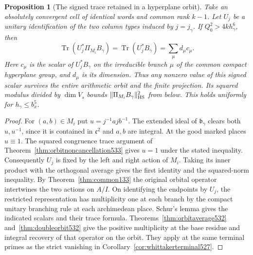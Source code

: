 \documentclass[a4paper,11pt]{article}
\newtheorem{proposition}{Proposition}[section]
\theoremstyle{definition}
\theoremstyle{remark}
\numberwithin{equation}{section}
\begin{document}
\begin{proposition}[The signed trace retained in a hyperplane orbit]
\leavevmode\label{prop:hyperplanetrace534}
Take an absolutely convergent cell of identical words and
common rank \(k-1\). Let \(U_j\) be a unitary identification
of the two column types induced by \(j=j_\gamma\). If
\(Q_0^2>4k h_\gamma^6\), then
\[
       \operatorname{Tr}(U_j^*\Pi_{M_i}B_\gamma)
          =\operatorname{Tr}(U_j^*B_\gamma)
          =\sum_{\mu}d_\mu c_\mu .
\]
Here \(c_\mu\) is the scalar of \(U_j^*B_\gamma\) on the
irreducible branch \(\mu\) of the common compact hyperplane
group, and \(d_\mu\) is its dimension. Thus any nonzero value
of this signed scalar survives the entire arithmetic orbit
and the finite projection. Its squared modulus divided by
\(\dim V_s\) bounds \(\|\Pi_{M_i}B_\gamma\|_{\rm HS}^2\) from
below. This holds uniformly for \(h_\gamma\le b_x^5\).
\end{proposition}
\begin{proof}
For \((a,b)\in M_i\) put \(u=j^{-1}ajb^{-1}\). The extended
ideal of \(\mathfrak b_\gamma\) clears both \(u,u^{-1}\), since
it is contained in \(\mathfrak c^2\) and \(a,b\) are integral.
At the good marked places \(u\equiv1\). The squared congruence
trace argument of Theorem~\ref{thm:orbitnoncancellation533}
gives \(u=1\) under the stated inequality. Consequently \(U_j\)
is fixed by the left and right action of \(M_i\). Taking its
inner product with the orthogonal average gives the first
identity and the squared-norm inequality. By
Theorem~\ref{thm:common133} the original orbital operator
intertwines the two actions on \(A/I\). On identifying the
endpoints by \(U_j\), the restricted representation has
multiplicity one at each branch by the compact unitary
branching rule at each archimedean place. Schur's lemma gives
the indicated scalars and their trace formula.
Theorems~\ref{thm:orbitaverage532} and~\ref{thm:doubleorbit532}
give the positive multiplicity at the base residue and integral
recovery of that operator on the orbit. They apply at the same
terminal primes as the strict vanishing in
Corollary~\ref{cor:whittakerterminal527}.
\end{proof}
\end{document}

